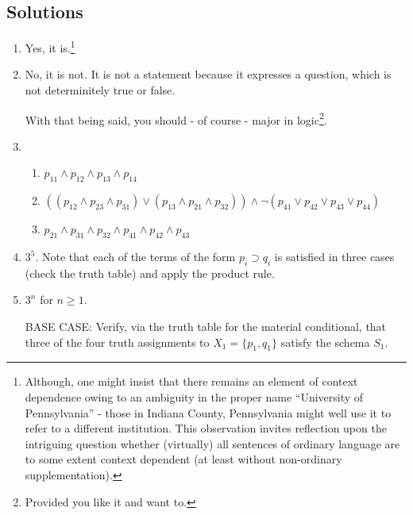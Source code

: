 \begin{mdframed}[linewidth=1]
\section*{Solutions}
\begin{enumerate}
    \item Yes, it is.\footnote{Although, one might insist that there remains an element of context dependence owing to an ambiguity in the proper name ``University of Pennsylvania'' - those in Indiana County, Pennsylvania might well use it to refer to a different institution. This observation invites reflection upon the intriguing question whether (virtually) all sentences of ordinary language are to some extent context dependent (at least without non-ordinary supplementation).}  

    \item No, it is not. It is not a statement because it expresses a question, which is not determinitely true or false. 

    With that being said, you should - of course - major in logic\footnote{Provided you like it and want to.}.

    \item 
    \begin{enumerate}
        \item $p_{11} \land p_{12} \land p_{13} \land p_{14}$

        \item $((p_{12} \land p_{23} \land p_{31}) \vee (p_{13} \land p_{21} \land p_{32})) \land \lnot(p_{41} \vee p_{42} \vee p_{43} \vee p_{44})$

        \item $p_{21} \land p_{31} \land p_{32} \land p_{41} \land p_{42} \land p_{43}$
    \end{enumerate}

    \item $3^5$. Note that each of the terms of the form $p_i \supset q_i$ is satisfied in three cases (check the truth table) and apply the product rule. 

    \item $3^n$ for $n \geq 1$. 

    BASE CASE: Verify, via the truth table for the material conditional, that three of the four truth assignments to $X_1=\{p_1,q_1\}$ satisfy the schema $S_1$. 


\end{enumerate}
\end{mdframed}
